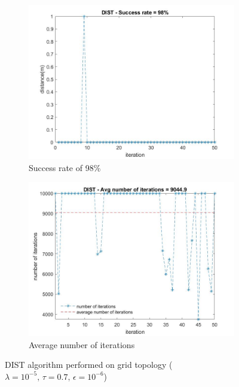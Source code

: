 \begin{figure}[H]
    \begin{subfigure}{0.45\textwidth}
        \centering
        \includegraphics[width=\textwidth]{img/DIST_distance_1e-5_grid.jpg}
        \caption{Success rate of 98\%}
    \end{subfigure}
    \hfill
    \begin{subfigure}{0.45\textwidth}
        \centering
        \includegraphics[width=\textwidth]{img/DIST_num_iterations_1e-5_grid.jpg}
        \caption{Average number of iterations}
    \end{subfigure}
    \caption{DIST algorithm performed on grid topology ($\lambda=10^{-5},\,\tau=0.7,\,\epsilon=10^{-6}$)}
\end{figure}

